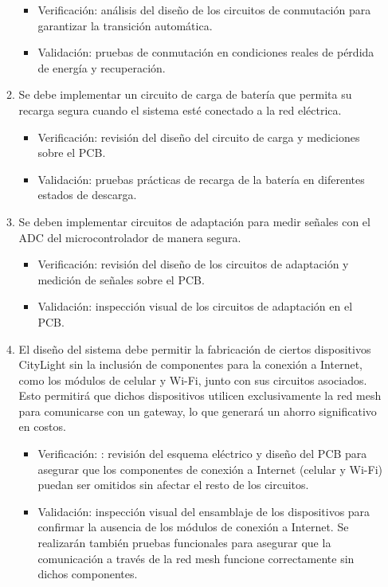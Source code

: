 \documentclass[
11pt, %
]{charter}
\begin{document}
\begin{enumerate}
\begin{enumerate}
				\begin{itemize}
				\item Verificación: análisis del diseño de los circuitos de conmutación para garantizar la transición automática.
				\item Validación: pruebas de conmutación en condiciones reales de pérdida de energía y recuperación.
				\end{itemize}
			\item Se debe implementar un circuito de carga de batería que permita su recarga segura cuando el sistema esté conectado a la red eléctrica.
				\begin{itemize}
				\item Verificación: revisión del diseño del circuito de carga y mediciones sobre el PCB.
				\item Validación: pruebas prácticas de recarga de la batería en diferentes estados de descarga.
				\end{itemize}
			\item Se deben implementar circuitos de adaptación para medir señales con el ADC del microcontrolador de manera segura.
				\begin{itemize}
				\item Verificación: revisión del diseño de los circuitos de adaptación y medición de señales sobre el PCB.
				\item Validación: inspección visual de los circuitos de adaptación en el PCB.
				\end{itemize}
			\item El diseño del sistema debe permitir la fabricación de ciertos dispositivos CityLight sin la inclusión de componentes para la conexión a Internet, como los módulos de celular y Wi-Fi, junto con sus circuitos asociados. Esto permitirá que dichos dispositivos utilicen exclusivamente la red mesh para comunicarse con un gateway, lo que generará un ahorro significativo en costos.
				\begin{itemize}
				\item Verificación: : revisión del esquema eléctrico y diseño del PCB para asegurar que los componentes de conexión a Internet (celular y Wi-Fi) puedan ser omitidos sin afectar el resto de los circuitos.
				\item Validación:  inspección visual del ensamblaje de los dispositivos para confirmar la ausencia de los módulos de conexión a Internet. Se realizarán también pruebas funcionales para asegurar que la comunicación a través de la red mesh funcione correctamente sin dichos componentes.
				\end{itemize}
		\end{enumerate}


\end{enumerate}
\end{document}
